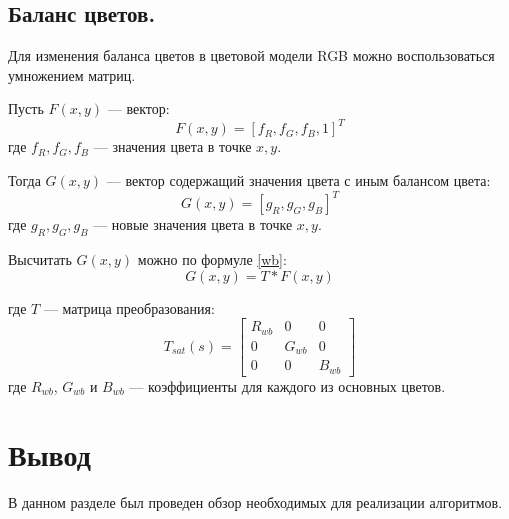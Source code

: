 \subsection{Баланс цветов.}

Для изменения баланса цветов в цветовой модели RGB можно воспользоваться умножением матриц.

Пусть $F(x,y)$ --- вектор:
\begin{equation}
	\label{F}
	F(x,y) = [f_R, f_G, f_B, 1]^T
\end{equation}
где $f_R, f_G, f_B$ --- значения цвета в точке $x,y$.

Тогда $G(x,y)$ --- вектор содержащий значения цвета с иным балансом цвета:
\begin{equation}
	\label{G}
	G(x,y) = [g_R, g_G, g_B]^T
\end{equation}
где $g_R, g_G, g_B$ --- новые значения цвета в точке $x,y$.

Высчитать $G(x,y)$ можно по формуле \ref{wb}:
\begin{equation}
	\label{wb}
	G(x,y) = T * F(x,y)
\end{equation}

где $T$ --- матрица преобразования:
\begin{equation}
	\label{twb}
	T_{sat}(s) = \begin{bmatrix}
		R_{wb} & 0 & 0 \\
		0 & G_{wb} & 0 \\ 
		0 & 0 & B_{wb} 
	\end{bmatrix}
\end{equation}
где $R_{wb}$, $G_{wb}$ и $B_{wb}$ --- коэффициенты для каждого из основных цветов.


\section*{Вывод}
В данном разделе был проведен обзор необходимых для реализации алгоритмов.